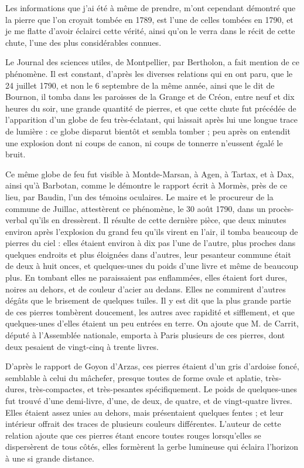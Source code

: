 \documentclass[a4paper, 12pt, oneside, french]{article}
\begin{document}
Les informations que j'ai été à même de prendre, m'ont cependant démontré que la pierre que l'on croyait tombée en 1789, est l'une de celles tombées en 1790, et je me flatte d'avoir éclairci cette vérité, ainsi qu'on le verra dans le récit de cette chute, l'une des plus considérables connues.

Le Journal des sciences utiles, de Montpellier, par Bertholon, a fait mention de ce phénomène. Il est constant, d'après les diverses relations qui en ont paru, que le 24 juillet 1790, et non le 6 septembre de la même année, ainsi que le dit de Bournon, il tomba dans les paroisses de la Grange et de Créon, entre neuf et dix heures du soir, une grande quantité de pierres, et que cette chute fut précédée de l'apparition d'un globe de feu très-éclatant, qui laissait après lui une longue trace de lumière : ce globe disparut bientôt et sembla tomber ; peu après on entendit une explosion dont ni coups de canon, ni coups de tonnerre n'eussent égalé le bruit.

Ce même globe de feu fut visible à Montde-Marsan, à Agen, à Tartax, et à Dax, ainsi qu'à Barbotan, comme le démontre le rapport écrit à Mormès, près de ce lieu, par Baudin, l'un des témoins oculaires. Le maire et le procureur de la commune de Juillac, attestèrent ce phénomène, le 30 août 1790, dans un procès-verbal qu'ils en dressèrent. Il résulte de cette dernière pièce, que deux minutes environ après l'explosion du grand feu qu'ils virent en l'air, il tomba beaucoup de pierres du ciel : elles étaient environ à dix pas l'une de l'autre, plus proches dans quelques endroits et plus éloignées dans d'autres, leur pesanteur commune était de deux à huit onces, et quelques-unes du poids d'une livre et même de beaucoup plus. En tombant elles ne paraissaient pas enflammées, elles étaient fort dures, noires au dehors, et de couleur d'acier au dedans. Elles ne commirent d'autres dégâts que le brisement de quelques tuiles. Il y est dit que la plus grande partie de ces pierres tombèrent doucement, les autres avec rapidité et sifflement, et que quelques-unes d'elles étaient un peu entrées en terre. On ajoute que M. de Carrit, député à l'Assemblée nationale, emporta à Paris plusieurs de ces pierres, dont deux pesaient de vingt-cinq à trente livres.

D'après le rapport de Goyon d'Arzas, ces pierres étaient d'un gris d'ardoise foncé, semblable à celui du mâchefer, presque toutes de forme ovale et aplatie, très-dures, très-compactes, et très-pesantes spécifiquement. Le poids de quelques-unes fut trouvé d'une demi-livre, d'une, de deux, de quatre, et de vingt-quatre livres. Elles étaient assez unies au dehors, mais présentaient quelques fentes ; et leur intérieur offrait des traces de plusieurs couleurs différentes. L'auteur de cette relation ajoute que ces pierres étant encore toutes rouges lorsqu'elles se dispersèrent de tous côtés, elles formèrent la gerbe lumineuse qui éclaira l'horizon à une si grande distance.
\end{document}
